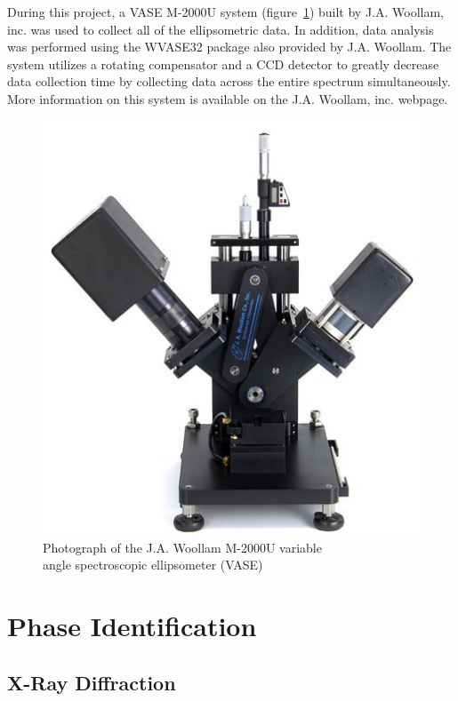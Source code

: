 During this project, a VASE M-2000U system (figure~\ref{fig:M2000_image}) built by J.A. Woollam, inc. was used to collect all of the ellipsometric data. In addition, data analysis was performed using the WVASE32 package also provided by J.A. Woollam. The system utilizes a rotating compensator and a CCD detector to greatly decrease data collection time by collecting data across the entire spectrum simultaneously.  More information on this system is available on the J.A. Woollam, inc. webpage.\cite{woollam-web}

\begin{figure}[htbp]
   \centering
   \includegraphics[width=0.66\linewidth]{./figures/characterization/M2000_ellipsometer_image.png} 
   \caption[J.A. Woollam M-2000U Ellipsometer]%
   		{Photograph of the J.A. Woollam M-2000U variable \\%
   		 angle spectroscopic ellipsometer (VASE)}
   \label{fig:M2000_image}
\end{figure}


	
\section{Phase Identification}


\subsection{X-Ray Diffraction}


